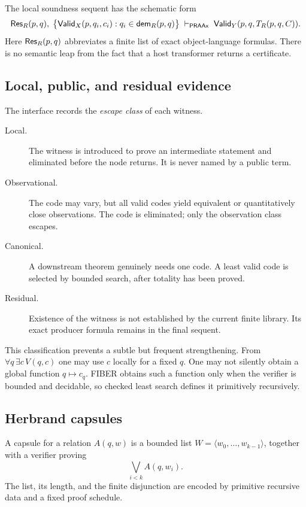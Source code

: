 The local soundness sequent has the schematic form
\[
  \mathsf{Res}_R(p,q),\;
  \bigl\{\mathsf{Valid}_X(p,q_i,c_i):q_i\in\mathsf{dem}_R(p,q)\bigr\}
  \;\vdash_{\mathsf{PRAAx}}\;
  \mathsf{Valid}_Y(p,q,T_R(p,q,C)).
\]
Here \(\mathsf{Res}_R(p,q)\) abbreviates a finite list of exact object-language
formulas.  There is no semantic leap from the fact that a host transformer
returns a certificate.

\subsection{Local, public, and residual evidence}

The interface records the \emph{escape class} of each witness.

\begin{description}
\item[Local.] The witness is introduced to prove an intermediate statement and
      eliminated before the node returns.  It is never named by a public term.
\item[Observational.] The code may vary, but all valid codes yield equivalent
      or quantitatively close observations.  The code is eliminated; only the
      observation class escapes.
\item[Canonical.] A downstream theorem genuinely needs one code.  A least
      valid code is selected by bounded search, after totality has been proved.
\item[Residual.] Existence of the witness is not established by the current
      finite library.  Its exact producer formula remains in the final sequent.
\end{description}

This classification prevents a subtle but frequent strengthening.  From
\(\forall q\,\exists c\,V(q,c)\) one may use \(c\) locally for a fixed \(q\).
One may not silently obtain a global function \(q\mapsto c_q\).  FIBER obtains
such a function only when the verifier is bounded and decidable, so checked
least search defines it primitively recursively.

\subsection{Herbrand capsules}

\begin{definition}
A capsule for a relation \(A(q,w)\) is a bounded list
\(W=\langle w_0,\ldots,w_{k-1}\rangle\), together with a verifier proving
\[
     \bigvee_{i<k} A(q,w_i).
\]
The list, its length, and the finite disjunction are encoded by primitive
recursive data and a fixed proof schedule.
\end{definition}

